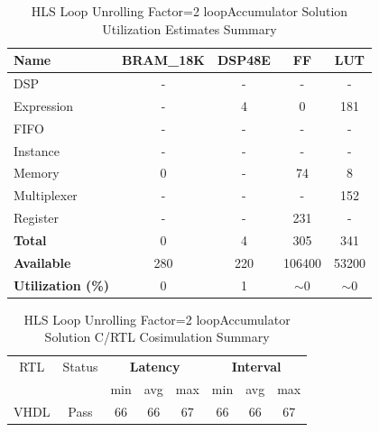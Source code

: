 \begin{table}[h]
	\centering
	\begin{tabular}{|l|c|c|c|c|}
		\hline
		\textbf{Name}    & \textbf{BRAM\_18K} & \textbf{DSP48E} & \textbf{FF} & \textbf{LUT} \\ \hline
		DSP              & -                   & -               & -           & -            \\ 
		Expression       & -                   & 4               & 0           & 181          \\ 
		FIFO             & -                   & -               & -           & -            \\ 
		Instance         & -                   & -               & -           & -            \\ 
		Memory           & 0                   & -               & 74          & 8            \\ 
		Multiplexer      & -                   & -               & -           & 152          \\ 
		Register         & -                   & -               & 231         & -            \\ \hline
		\textbf{Total}   & 0                   & 4               & 305         & 341          \\ \hline
		\textbf{Available} & 280               & 220             & 106400      & 53200        \\ \hline
		\textbf{Utilization (\%)} & 0            & 1               & $\sim$0     & $\sim$0      \\ \hline
	\end{tabular}
	\caption{HLS Loop Unrolling Factor=2 loopAccumulator Solution Utilization Estimates Summary}
	\label{tab:hls-loop-unrolling-2-loopAccumulator-solution-utilization-estimates-summary}
\end{table}

\begin{table}[H]
	\centering
	\begin{tabular}{|c|c|c|c|c|c|c|c|}
		\hline
		\multicolumn{1}{|c|}{RTL} & \multicolumn{1}{|c|}{Status} & \multicolumn{3}{c|}{\textbf{Latency}} & \multicolumn{3}{c|}{\textbf{Interval}} \\
		&  & min & avg & max & min & avg & max \\
		\hline
		VHDL & Pass & 66 & 66 & 67 & 66 & 66 & 67 \\
		\hline
	\end{tabular}
	\caption{HLS Loop Unrolling Factor=2 loopAccumulator Solution C/RTL Cosimulation Summary }
	\label{tab:hls-loop-unrolling-2-loopAccumulator-solution-cosimulation-summary}
\end{table}

